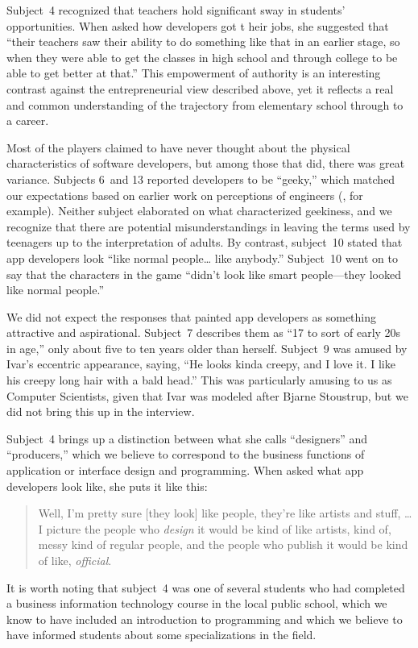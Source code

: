 \documentclass[letterpaper]{article}
\begin{document}
Subject~4 recognized that teachers hold significant sway in students'
opportunities. When asked how developers got t heir jobs, she suggested
that ``their teachers saw their ability to do something
like that in an earlier stage, so when they were able to get
the classes in high school and through college to be able to get better
at that.''
This empowerment of authority is an interesting contrast
against the entrepreneurial view described above,
yet it reflects a real and common understanding of the trajectory
from elementary school through to a career.




Most of the players claimed to have never thought about the physical
characteristics of software developers, but among those that did,
there was great variance.  Subjects 6~and 13 reported developers to be
``geeky,'' which matched our expectations based on earlier work on
perceptions of engineers (\citet{Margolis2003}, for example). Neither
subject elaborated on what characterized geekiness, and we recognize
that there are potential misunderstandings in leaving the terms used
by teenagers up to the interpretation of adults.  
By contrast,
subject~10 stated that app developers look ``like normal
people\ldots{} like anybody.''
Subject~10 went on to say that the characters in the game
``didn't look like smart people---they looked like normal people.''

We did not expect the responses that painted app developers as something
attractive and aspirational. Subject~7 describes them as ``17 to sort of
early 20s in age,'' only about five to ten years older than herself.
Subject~9 was amused by Ivar's eccentric appearance, saying, ``He looks
kinda creepy, and I love it. I like his creepy long hair with a bald head.''
This was particularly amusing to us as Computer Scientists, given that
Ivar was modeled after Bjarne Stoustrup, but we did not bring this up
in the interview.

Subject~4 brings up a distinction between what she calls ``designers''
and ``producers,'' which we believe to correspond to the business functions
of application or interface design and programming. 
When asked what app developers look like, she puts it like this:
\begin{quote}
Well, I'm pretty sure [they look] like people, they're like artists
and stuff, \ldots{} I picture the people who \textit{design} it would
be kind of like artists, kind of, messy kind of regular people, and the
people who publish it would be kind of like, \textit{official}.
\end{quote}
It is worth noting that subject~4 was one of several students who had
completed a business information technology course in the local public
school, which we know to have included an introduction to programming
and which we believe to have informed students about some
specializations in the field.
\end{document}
